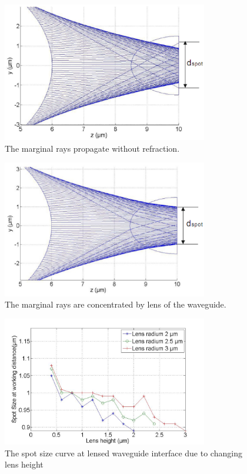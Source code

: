 \begin{figure}[!ht]
\centering
\includegraphics[width=0.8\textwidth]{bilder/beam_ray_without_refract}
\caption{The marginal rays propagate without refraction.}
\label{fig:matlab_coupling_lenses_rxx}
\end{figure}
\begin{figure}[!ht]
\centering
\includegraphics[width=0.8\textwidth]{bilder/beam_ray_refract}
\caption{The marginal rays are concentrated by lens of the waveguide.}
\label{fig:matlab_coupling_lenses_rxx2}
\end{figure}
\begin{figure}[!ht]
\centering
\includegraphics[width=0.8\textwidth]{bilder/spot_fix_lens_radium_hxx}
\caption{The spot size curve at lensed waveguide interface due to changing lens height}
\label{fig:lensed_guide_spot_size_curve}
\end{figure}

